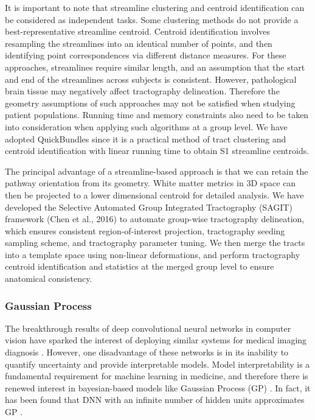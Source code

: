 It is important to note that streamline clustering and centroid identification can be considered as independent tasks. Some clustering methods do not provide a best-representative streamline centroid. Centroid identification involves resampling the streamlines into an identical number of points, and then identifying point correspondences via different distance measures. For these approaches, streamlines require similar length, and an assumption that the start and end of the streamlines across subjects is consistent. However, pathological brain tissue may negatively affect tractography delineation. Therefore the geometry assumptions of such approaches may not be satisfied when studying patient populations. Running time and memory constraints also need to be taken into consideration when applying such algorithms at a group level. We have adopted QuickBundles since it is a practical method of tract clustering and centroid identification with linear running time to obtain S1 streamline centroids. \cite{Garyfallidis2012}

The principal advantage of a streamline-based approach is that we can retain the pathway orientation from its geometry. White matter metrics in 3D space can then be projected to a lower dimensional centroid for detailed analysis. We have developed the Selective Automated Group Integrated Tractography (SAGIT) framework (Chen et al., 2016) to automate group-wise tractography delineation, which ensures consistent region-of-interest projection, tractography seeding sampling scheme, and tractography parameter tuning. We then merge the tracts into a template space using non-linear deformations, and  perform tractography centroid identification and statistics at the merged group level to ensure anatomical consistency. 

\subsubsection{Gaussian Process}
The breakthrough results of deep convolutional neural networks in computer vision \cite{Krizhevsky2012} have sparked the interest of deploying similar systems for medical imaging diagnosis \cite{Greenspan2016}. However, one disadvantage of these networks is in its inability to quantify uncertainty and provide interpretable models. Model interpretability is a fundamental requirement for machine learning in medicine, and therefore there is renewed interest in bayesian-based models like Gaussian Process (GP) \cite{gal2016dropout}. In fact, it has been found that DNN with an infinite number of hidden units approximates GP \cite{neal1996priors}. 

